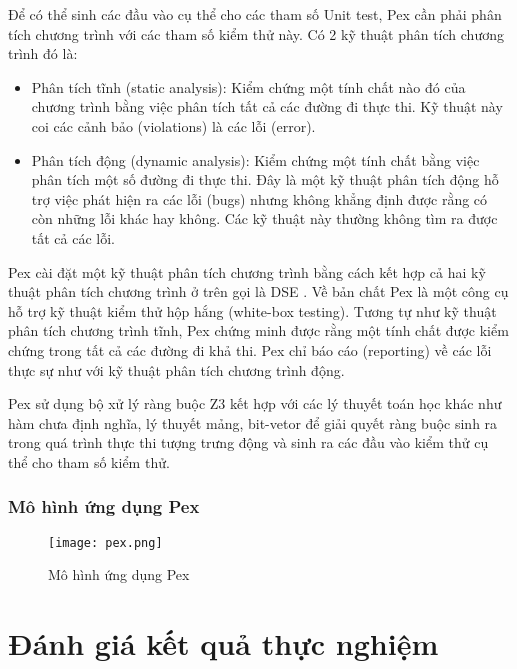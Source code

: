 Để có thể sinh các đầu vào cụ thể cho các tham số Unit test, Pex cần
phải phân tích chương trình với các tham số kiểm thử này. Có 2 kỹ
thuật phân tích chương trình đó là:

\begin{itemize}
\item Phân tích tĩnh (static analysis): Kiểm chứng một tính chất nào
  đó của chương trình bằng việc phân tích tất cả các đường đi thực
  thi. Kỹ thuật này coi các cảnh bảo (violations) là các lỗi (error).
\item Phân tích động (dynamic analysis): Kiểm chứng một tính chất bằng
  việc phân tích một số đường đi thực thi. Đây là một kỹ thuật phân
  tích động hỗ trợ việc phát hiện ra các lỗi (bugs) nhưng không khẳng
  định được rằng có còn những lỗi khác hay không. Các kỹ thuật này
  thường không tìm ra được tất cả các lỗi.
\end{itemize}

Pex cài đặt một kỹ thuật phân tích chương trình bằng cách kết hợp cả hai kỹ thuật phân tích chương trình ở trên gọi là DSE \cite{xie2009fitness, godefroid2005dart}. Về bản chất Pex là một công cụ hỗ trợ kỹ thuật kiểm thử hộp hắng (white-box testing). Tương tự như kỹ thuật phân tích chương trình tĩnh, Pex chứng minh được rằng một tính chất được kiểm chứng trong tất cả các đường đi khả thi. Pex chỉ báo cáo (reporting) về các lỗi thực sự như với kỹ thuật phân tích chương trình động.

Pex sử dụng bộ xử lý ràng buộc Z3 \cite{de2008z3} kết hợp với các lý thuyết toán học khác như hàm chưa định nghĩa, lý thuyết mảng, bit-vetor \cite{kroening2016decision} để giải quyết ràng buộc sinh ra trong quá trình thực thi tượng trưng động và sinh ra các đầu vào kiểm thử cụ thể cho tham số kiểm thử.

\subsubsection*{Mô hình ứng dụng Pex}
\begin{center}
	\begin{figure}[H]
		\begin{center}
			\texttt{[image: pex.png]}
		\end{center}
		\caption{Mô hình ứng dụng Pex}
		
	\end{figure}
\end{center}

\section{Đánh giá kết quả thực nghiệm}

